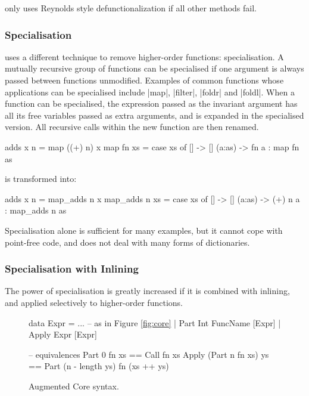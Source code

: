 \catch{} only uses Reynolds style defunctionalization if all other methods fail.


\subsubsection{Specialisation}

\oldtool{} uses a different technique to remove higher-order functions: specialisation. A mutually recursive group of functions can be specialised if one argument is always passed between functions unmodified. Examples of common functions whose applications can be specialised include |map|, |filter|, |foldr| and |foldl|. When a function can be specialised, the expression passed as the invariant argument has all its free variables passed as extra arguments, and is expanded in the specialised version. All recursive calls within the new function are then renamed.

\begin{example}
\begin{code}
adds x n = map ((+) n) x
map fn xs =  case  xs of
             []      -> []
             (a:as)  -> fn a : map fn as
\end{code}

\noindent is transformed into:

\begin{code}
adds x n = map_adds n x
map_adds n xs =  case  xs of
                 []      -> []
                 (a:as)  -> (+) n a : map_adds n as
\end{code}\codeexample
\end{example}

Specialisation alone is sufficient for many examples, but it cannot cope with point-free code, and does not deal with many forms of dictionaries.

\subsubsection{Specialisation with Inlining}

The power of specialisation is greatly increased if it is combined with inlining, and applied selectively to higher-order functions.

\begin{figure}
\ignore\begin{code}
data Expr  =  ... -- as in Figure {\ref{fig:core}}
           |  Part   Int FuncName [Expr]
           |  Apply  Expr [Expr]

-- equivalences
Part 0 fn xs == Call fn xs
Apply (Part n fn xs) ys == Part (n - length ys) fn (xs ++ ys)
\end{code}
\caption{Augmented Core syntax.}
\label{fig:core_ho}
\figureend
\end{figure}

